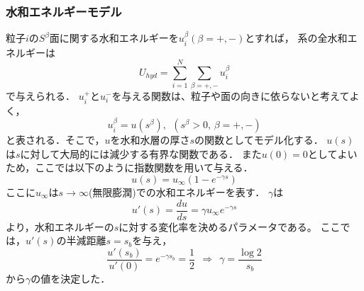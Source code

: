 \subsubsection{水和エネルギーモデル}
粒子$i$の$S^\beta$面に関する水和エネルギーを$u^\beta_i(\beta=+,-)$とすれば，
系の全水和エネルギーは
\begin{equation}
	U_{hyd}=\sum_{i=1}^N\sum_{\beta=+,-} u_i^{\beta}
	\label{eqn:}
\end{equation}
で与えられる．
$u^+_i$と$u^-_i$を与える関数は、粒子や面の向きに依らないと考えてよく，
\begin{equation}
	u^\beta_i= u(s^\beta), \ \ (s^\beta>0,\, \beta=+,-)
	\label{eqn:}
\end{equation}
と表される．そこで，$u$を水和水層の厚さ$s$の関数としてモデル化する．
$u(s)$は$s$に対して大局的には減少する有界な関数である．
また$u(0)=0$としてよいため，ここでは以下のように指数関数を用いて与える．
\begin{equation}
	u(s)=u_{\infty} \left(1-e^{-\gamma s} \right)
	\label{eqn:u_s}
\end{equation}
ここに$u_{\infty}$は$s\rightarrow \infty$(無限膨潤)での水和エネルギーを表す．
$\gamma$は
\begin{equation}
	u'(s)=\frac{du}{ds}=\gamma u_{\infty} e^{-\gamma s}
	\label{eqn:ud_s}
\end{equation}
より，水和エネルギーの$s$に対する変化率を決めるパラメータである。
ここでは，$u'(s)$の半減距離$s=s_b$を与え，
\begin{equation}
	\frac{u'\left(s_b\right)}{u'(0)}=e^{-\gamma s_b}=\frac{1}{2} 
	\ \ \Rightarrow \ \
	\gamma=\frac{\log 2}{s_b}
	\label{eqn:}
\end{equation}
から$\gamma$の値を決定した．
